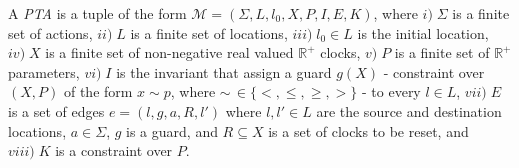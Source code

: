 \begin{definition}
A \textit{PTA} is a tuple of the form $\mathcal{M} = (\Sigma, L, l_0, X, P, I, E, K)$, where $i) \; \Sigma$ is a finite set of actions, $ii) \; L$ is a finite set of locations, $iii) \;l_0 \in L$ is the initial location, $iv) \; X$ is a finite set of non-negative real valued $\mathbb{R}^+$ clocks, $v)\; P$ is a finite set of $\mathbb{R}^+$ parameters, $vi)\; I$ is the invariant that assign a guard  $g(X)$ - constraint over $(X, P)$ of the form $x \sim p$, where $\sim \, \in \{ <, \leq, \geq , > \}$ - to every $l \in L$, $vii) \;E$ is a set of edges $e = (l, g, a, R, l')$ where $l, l' \in L$ are the source and destination locations, $a \in \Sigma$, $g$ is a guard, and $R \subseteq X$ is a set of clocks to be reset, and $viii) \;K$ is a constraint over $P$.    
\end{definition}

